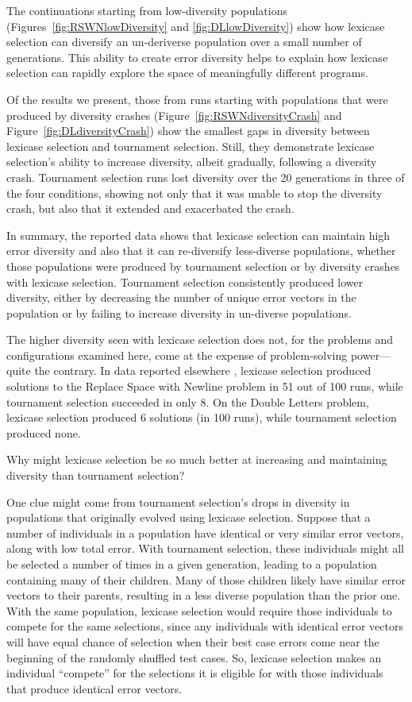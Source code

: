 \documentclass{sig-alternate-05-2015}
\begin{document}
The continuations starting from low-diversity populations (Figures~\ref{fig:RSWNlowDiversity} and \ref{fig:DLlowDiversity}) show how lexicase selection can diversify an un-deriverse population over a small number of generations. This ability to create error diversity helps to explain how lexicase selection can rapidly explore the space of meaningfully different programs.


Of the results we present, those from runs starting with populations that were produced by diversity crashes (Figure~\ref{fig:RSWNdiversityCrash} and Figure~\ref{fig:DLdiversityCrash}) show the smallest gaps in diversity between lexicase selection and tournament selection. Still, they demonstrate lexicase selection's ability to increase diversity, albeit gradually, following a diversity crash. Tournament selection runs lost diversity over the 20 generations in three of the four conditions, showing not only that it was unable to stop the diversity crash, but also that it extended and exacerbated the crash.

In summary, the reported data shows that lexicase selection can maintain high error diversity and also that it can re-diversify less-diverse populations, whether those populations were produced by tournament selection or by diversity crashes with lexicase selection. Tournament selection consistently produced lower diversity, either by decreasing the number of unique error vectors in the population or by failing to increase diversity in un-diverse populations. 

The higher diversity seen with lexicase selection does not, for the problems and configurations examined here, come at the expense of problem-solving power---quite the contrary. In data reported elsewhere \cite{Helmuth:2015:GECCO}, lexicase selection produced solutions to the Replace Space with Newline problem in 51 out of 100 runs, while tournament selection succeeded in only 8. On the Double Letters problem, lexicase selection produced 6 solutions (in 100 runs), while tournament selection produced none.

Why might lexicase selection be so much better at increasing and maintaining diversity than tournament selection?

One clue might come from tournament selection's drops in diversity in populations that originally evolved using lexicase selection. Suppose that a number of individuals in a population have identical or very similar error vectors, along with low total error. With tournament selection, these individuals might all be selected a number of times in a given generation, leading to a population containing many of their children. Many of those children likely have similar error vectors to their parents, resulting in a less diverse population than the prior one. With the same population, lexicase selection would require those individuals to compete for the same selections, since any individuals with identical error vectors will have equal chance of selection when their best case errors come near the beginning of the randomly shuffled test cases. So, lexicase selection makes an individual ``compete'' for the selections it is eligible for with those individuals that produce identical error vectors.
\end{document}
